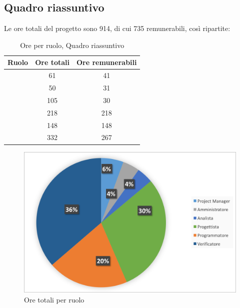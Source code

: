 \subsection{Quadro riassuntivo}
Le ore totali del progetto sono 914, di cui 735 remunerabili, così ripartite:

\begin{table}[h]
	\begin{center}
		\begin{tabular}{|c|c|c|}
			\hline
			\textbf{Ruolo}	& \textbf{Ore totali} & \textbf{Ore remunerabili} \\
			\hline
			\Pm &	61	&	41	\\
			\hline
			\Am	&	50	&	31	\\
			\hline
			\An		&	105	&	30	\\
			\hline
			\Prog		&	218	&	218	\\
			\hline
			\Progr	&	148	&	148	\\
			\hline
			\Ver	&	332	&	267	\\
			\hline
		\end{tabular}
	\end{center}
	\caption{Ore per ruolo, Quadro riassuntivo}
\end{table}

\begin{figure}[H]
	\centering 
	\includegraphics[scale=0.7]{Immagini/GraficiTorte/TOT.png}
	\caption{Ore totali per ruolo}
\end{figure}